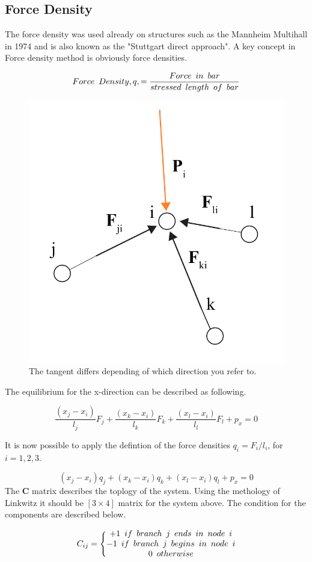 \subsection{Force Density}

The force density was used already on structures such as the Mannheim Multihall in 1974 and is also known as the "Stuttgart direct approach". A key concept in Force density method is obviously force densities.

$$ Force \enskip Density, q, = \frac{Force\enskip in \enskip bar}{stressed\enskip length\enskip of\enskip bar}$$

\begin{figure}[H]
\centering
\includegraphics[width=0.45\linewidth ]{figure/Theory/NodeEqFD.pdf}
\caption{The tangent differs depending of which direction you refer to. }
\end{figure}

The equilibrium for the x-direction can be described as following.

\begin{equation}
\frac{(x_j - x_i)}{l_j}F_j +\frac{(x_k - x_i)}{l_k}F_k+ \frac{(x_l - x_i)}{l_l}F_l + p_x = 0
\end{equation}

It is now possible to apply the defintion of the force densities $q_i = F_i/l_i$, for $i = 1,2,3$.

\begin{equation}
(x_j - x_i)q_j +(x_k - x_i)q_k + (x_l - x_i)q_l  + p_x = 0
\end{equation}
The \textbf{C} matrix describes the toplogy of the system. Using the methology of Linkwitz it should be $[3\times 4]$ matrix for the system above. The condition for the components are described below.

\begin{equation}
C_{ij} = \Bigg\{ \begin{matrix} 
+1\enskip if\enskip branch\enskip j\enskip ends\enskip in\enskip node\enskip i \\ 
-1\enskip if\enskip branch\enskip j\enskip begins\enskip in\enskip node\enskip i \\ 
0 \enskip otherwise  
\end{matrix}
\end{equation}

